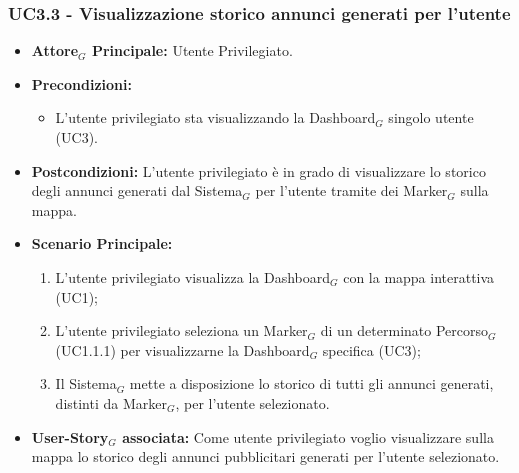 \documentclass[10pt]{article}
\begin{document}
\begin{justify}
\subsubsection{\textbf{UC3.3 - Visualizzazione storico annunci generati per l'utente}}
\label{UC3.3}
\begin{itemize}
    \item \textbf{Attore$_G$ Principale:} Utente Privilegiato.
    \item \textbf{Precondizioni:} 
        \begin{itemize}
    		\item L'utente privilegiato sta visualizzando la Dashboard$_G$ singolo utente (UC3).
        \end{itemize}
     \item \textbf{Postcondizioni:} L'utente privilegiato è in grado di visualizzare lo storico degli annunci generati dal Sistema$_G$ per l'utente tramite dei Marker$_G$ sulla mappa.
    \item \textbf{Scenario Principale:} 
      \begin{enumerate}
            \item L'utente privilegiato visualizza la Dashboard$_G$ con la mappa interattiva (UC1);
            \item L'utente privilegiato seleziona un Marker$_G$ di un determinato Percorso$_G$ (UC1.1.1) per visualizzarne la Dashboard$_G$ specifica (UC3);
            \item Il Sistema$_G$ mette a disposizione lo storico di tutti gli annunci generati, distinti da Marker$_G$, per l'utente selezionato.
	\end{enumerate}
    \item \textbf{User-Story$_G$ associata:} Come utente privilegiato voglio visualizzare sulla mappa lo storico degli annunci pubblicitari generati per l'utente selezionato.
\end{itemize}

\end{justify}
\end{document}
